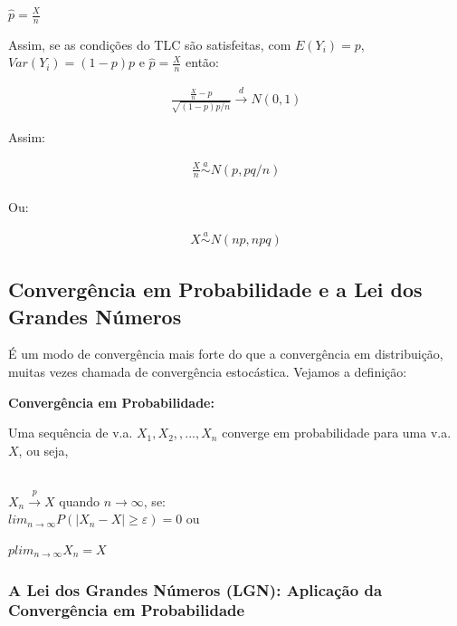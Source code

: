 \documentclass[
  letterpaper,
  DIV=11,
  numbers=noendperiod]{scrartcl}
\begin{document}
\(\hat{p}=\frac{X}{n}\)

Assim, se as condições do TLC são satisfeitas, com \(E(Y_i)=p\),
\(Var(Y_i)=(1-p)p\) e \(\hat{p}=\frac{X}{n}\) então:

\[\begin{array}{ccc}
\frac{\frac{X}{n}-p} {\sqrt{(1-p)p/n}}\overset{d}{\rightarrow} N(0,1)
\end{array}\]

\hfill\break

Assim:

\hfill\break
\[\begin{array}{ccc}
\frac{X}{n} \overset{a}{\sim } N(p, pq/n)
\end{array}\]\\
Ou:

\hfill\break
\[\begin{array}{ccc}
X \overset{a}{\sim } N(np, npq)
\end{array}\]

\subsection{Convergência em Probabilidade e a Lei dos Grandes
Números}\label{converguxeancia-em-probabilidade-e-a-lei-dos-grandes-nuxfameros}

É um modo de convergência mais forte do que a convergência em
distribuição, muitas vezes chamada de convergência estocástica. Vejamos
a definição:

\begin{definicao}

\textbf{Convergência em Probabilidade:}

Uma sequência de v.a. \(X_1,X_2,,...,X_n\) converge em probabilidade
para uma v.a. \(X\), ou seja,\\
\strut \\

\(X_n \overset{p}{\rightarrow} X\) quando \(n \rightarrow \infty\),
se:\\

\(lim_{n \rightarrow \infty} P(|X_n - X |\geq \varepsilon) = 0\) ou

\hfill\break

\(plim_{n \rightarrow \infty} X_n = X\)

\end{definicao}

\subsubsection{A Lei dos Grandes Números (LGN): Aplicação da
Convergência em
Probabilidade}\label{a-lei-dos-grandes-nuxfameros-lgn-aplicauxe7uxe3o-da-converguxeancia-em-probabilidade}
\end{document}
